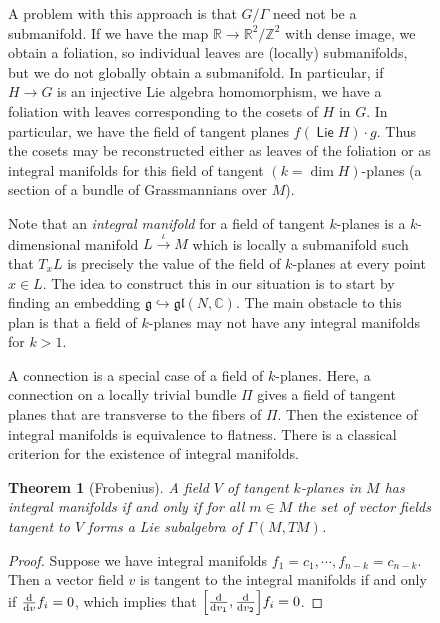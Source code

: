 \documentclass[leqno, openany]{memoir}
\newtheorem{thm}{Theorem}[section]
\theoremstyle{definition}
\theoremstyle{remark}
\theoremstyle{plain}
\theoremstyle{definition}
\theoremstyle{remark}
\newcommand{\R}{\mathbb{R}}
\newcommand{\C}{\mathbb{C}}
\newcommand{\Z}{\mathbb{Z}}
\newcommand{\mf}[1]{\mathfrak{#1}}
\DeclareMathOperator{\Lie}{\mathsf{Lie}}
\begin{document}
\begin{figure}[H]
\begin{enumerate}
        A problem with this approach is that $G/\Gamma$ need not be a
submanifold. If we have the map $\R \to \R^2 / \Z^2$ with dense image, we
obtain a foliation, so individual leaves are (locally) submanifolds, but we do
not globally obtain a submanifold. In particular, if $H \to G$ is an injective
Lie algebra homomorphism, we have a foliation with leaves corresponding to the
cosets of $H$ in $G$. In particular, we have the field of tangent planes
$f(\Lie H) \cdot g$. Thus the cosets may be reconstructed either as leaves of
the foliation or as integral manifolds for this field of tangent $(k=\dim
H)$-planes (a section of a bundle of Grassmannians over $M$).  \end{enumerate}

Note that an \textit{integral manifold} for a field of tangent $k$-planes is a
$k$-dimensional manifold $L \xrightarrow{\iota} M$ which is locally a
submanifold such that $T_xL$ is precisely the value of the field of $k$-planes
at every point $x \in L$. The idea to construct this in our situation is to
start by finding an embedding $\mf{g} \hookrightarrow \mf{gl}(N, \C)$. The main
obstacle to this plan is that a field of $k$-planes may not have any integral
manifolds for $k > 1$. 

A connection is a special case of a field of $k$-planes. Here, a connection on
a locally trivial bundle $\Pi$ gives a field of tangent planes that are
transverse to the fibers of $\Pi$. Then the existence of integral manifolds is
equivalence to flatness. There is a classical criterion for the existence of
integral manifolds.

\begin{thm}[Frobenius] A field $V$ of tangent $k$-planes in $M$ has integral
manifolds if and only if for all $m \in M$ the set of vector fields tangent to
$V$ forms a Lie subalgebra of $\Gamma(M, TM)$.  \end{thm}

\begin{proof} Suppose we have integral manifolds $f_1 = c_1, \cdots, f_{n-k} =
    c_{n-k}$. Then a vector field $v$ is tangent to the integral manifolds if
    and only if $\dv{v} f_i = 0$, which implies that $\qty[ \dv{v_1}, \dv{v_2}
    ] f_i = 0$.


\end{proof}
\end{figure}
\end{document}
